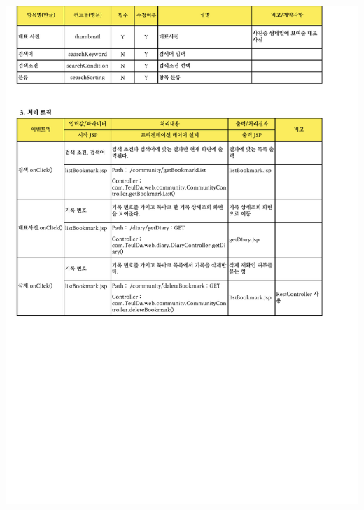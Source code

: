 {{{{{{{{{{{{{{{{{{{{{\includegraphics[width=20cm]{./Figure/Analysis/Display/diary/diary_20.pdf} \\
}}}}}}}}}}}}}}}}}}}}}
